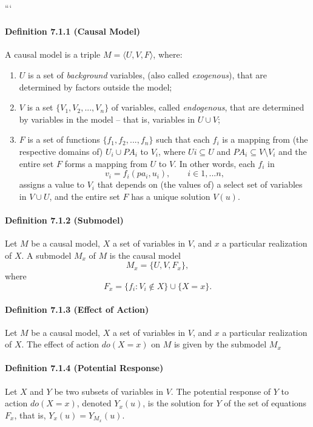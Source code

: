 \vspace{1cm}

```
\paragraph{Definition 7.1.1 (Causal Model)}
A causal model is a triple
$M = \langle U, V, F\rangle$,
where:
\begin{enumerate}[label=(\roman*)]
    \item $U$ is a set of \emph{background} variables, (also called \emph{exogenous}), that are determined by factors outside the model;
    \item $V$ is a set $\{V_1 , V_2 ,..., V_n\}$ of variables, called \emph{endogenous}, that are determined by variables in the model -- that is, variables in $U\cup V$;
    \item $F$ is a set of functions $\{f_1 , f_2 ,..., f_n\}$ such that each $f_i$ is a mapping from (the respective domains of) $U_i \cup PA_i$ to $V_i$, where $U i \subseteq U$ and $PA_i \subseteq V \setminus V_i$ and the entire set $F$ forms a mapping from $U$ to $V$. In other words, each $f_i$ in $$v_i = f_i (pa_i , u_i ),\qquad  i\in 1, ... n,$$ assigns a value to $V_i$ that depends on (the values of) a select set of variables in $V \cup U$, and the entire set $F$ has a unique solution $V(u)$.
\end{enumerate}

\paragraph{Definition 7.1.2 (Submodel)}
Let $M$ be a causal model, $X$ a set of variables in $V$, and $x$ a particular realization of $X$. A submodel $M_x$ of $M$ is the causal model $$M_x =\{U, V, F_x\},$$ where $$F_x = \{ f_i : V_i \notin X\}\cup\{ X = x\}.$$

\paragraph{Definition 7.1.3 (Effect of Action)}
Let $M$ be a causal model, $X$ a set of variables in $V$, and $x$ a particular realization of $X$. The effect of action $do(X=x)$ on $M$ is given by the submodel $M_x$

\paragraph{Definition 7.1.4 (Potential Response)}
Let $X$ and $Y$ be two subsets of variables in $V$. The potential response of $Y$ to action $do(X = x)$, denoted $Y_x(u)$, is the solution for $Y$ of the set of equations $F_x$, that is, $Y_x(u) = Y_{M_x}(u)$.

